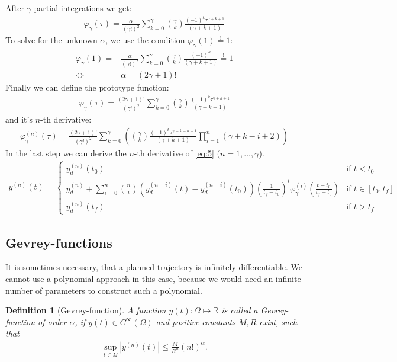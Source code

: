 \documentclass[a4paper,11pt,headings=standardclasses,parskip=half]{scrartcl}
\newtheorem{defi}{Definition}[section]
\newcommand{\R}{\mathbb{R}} %
\begin{document}
After $\gamma$ partial integrations we get:
\begin{align*}
\varphi_\gamma(\tau)= \frac{\alpha}{(\gamma!)^2} \sum_{k=0}^{\gamma} \binom{\gamma}{k} \frac{(-1)^k\tau^{\gamma+k+1}}{(\gamma+k+1)}
\end{align*}
To solve for the unknown $\alpha$, we use the condition $\varphi_\gamma(1)\overset{!}{=}1$:
\begin{align*}
\varphi_\gamma(1)= &\frac{\alpha}{(\gamma!)^2} \sum_{k=0}^{\gamma} \binom{\gamma}{k} \frac{(-1)^k}{(\gamma+k+1)} \overset{!}{=} 1 \\
\Leftrightarrow \quad & \alpha = (2\gamma+1)!
\end{align*}
Finally we can define the prototype function:
\begin{align}
\varphi_\gamma(\tau)= \frac{(2\gamma+1)!}{(\gamma!)^2} \sum_{k=0}^{\gamma} \binom{\gamma}{k} \frac{(-1)^k\tau^{\gamma+k+1}}{(\gamma+k+1)}
\end{align}
and it's $n$-th derivative:
\begin{align}
\varphi_\gamma^{(n)}(\tau)= \frac{(2\gamma+1)!}{(\gamma!)^2} \sum_{k=0}^{\gamma} \left(\binom{\gamma}{k} \frac{(-1)^k\tau^{\gamma+k-n+1}}{(\gamma+k+1)}\prod_{i=1}^n(\gamma+k-i+2)\right)
\end{align}
In the last step we can derive the $n$-th derivative of \eqref{eq:5} $(n=1,...,\gamma$).
\begin{align}
y^{(n)}(t) = \begin{cases} y_d^{(n)}(t_0) & \textrm{if } t<t_0 \\ 
y_d^{(n)} + \sum_{i=0}^{n}\binom{n}{i}(y_d^{(n-i)}(t)-y_d^{(n-i)}(t_0))\left(\frac{1}{t_f-t_0}\right)^i\varphi_\gamma^{(i)}\left(\frac{t-t_0}{t_f-t_0}\right) &\textrm{if } t \in [t_0, t_f] \\ 
y_d^{(n)}(t_f)&\textrm{if } t>t_f\end{cases}
\end{align}
\subsection{Gevrey-functions}
It is sometimes necessary, that a planned trajectory is infinitely differentiable. We cannot use a polynomial approach in this case, because we would need an infinite number of parameters to construct such a polynomial. 
\begin{defi}[Gevrey-function] A function $y(t):\Omega \mapsto \R$ is called a Gevrey-function of order $\alpha$, if $y(t) \in C^\infty(\Omega)$ and positive constants $M, R$ exist, such that
\begin{align*}
\sup_{t\in\Omega}{|y^{(n)}(t)| \leq \frac{M}{R^n}(n!)^\alpha}.
\end{align*}
\end{defi}
\end{document}
